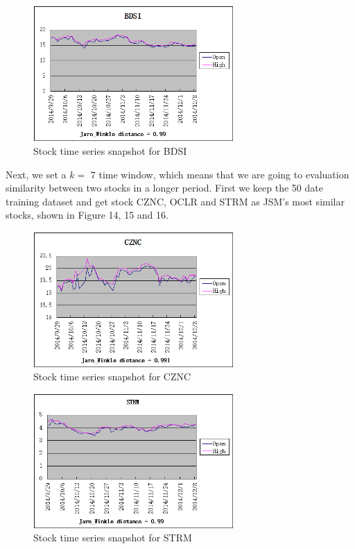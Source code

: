 \documentclass[10pt, conference, compsocconf]{IEEEtran}
\begin{document}
\par
\vspace{2mm}
 \begin{figure}[!h]
\includegraphics[width=3in]{figures/BDSI}
\caption{Stock time series snapshot for BDSI}
\vspace{1mm}
\end{figure}
\par

\vspace{1mm}
\par
Next, we set a $k=$ 7 time window, which means that we are going to evaluation similarity between two stocks in a longer period. First we keep the 50 date training dataset and get stock CZNC, OCLR and STRM as JSM's most similar stocks, shown in Figure 14, 15 and 16.
\par
 \begin{figure}[!h]
\vspace{2mm}
\includegraphics[width=3in]{figures/CZNC}
\caption{Stock time series snapshot for CZNC}
\vspace{1mm}
\end{figure}
\par

\par
 \begin{figure}[!h]
\vspace{2mm}
\includegraphics[width=3in]{figures/STRM}
\caption{Stock time series snapshot for STRM}
\vspace{1mm}
\end{figure}
\par
\end{document}
